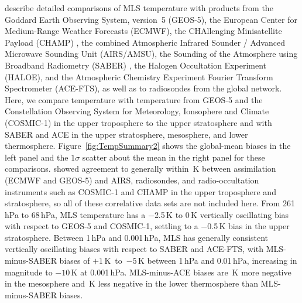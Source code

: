 \sloppypar\citet{SchwartzEtal:2008:Validation} describe detailed comparisons of MLS \vii temperature with products from the Goddard Earth Observing System, version~5 \citep{RieneckerEtal:2007} (\mbox{GEOS-5}), the European Center for Medium-Range Weather Forecasts \citep[e.g.,][]{SimmonsEtal05} (ECMWF), the CHAllenging Minisatellite Payload (CHAMP) \citep{WickertEtal01}, the combined Atmospheric Infrared Sounder / Advanced Microwave Sounding Unit (AIRS/AMSU), the Sounding of the Atmosphere using Broadband Radiometry (SABER) \citep{MlynczakAndRussell:1995}, the Halogen Occultation Experiment \citep{HervigEtal:1996} (HALOE), and the Atmospheric Chemistry Experiment Fourier Transform Spectrometer \citep{BernathEtal:2005} (ACE-FTS), as well as to radiosondes from the global network. Here, we compare \thisv temperature with temperature from \mbox{GEOS-5} and the Constellation Observing System for Meteorology, Ionsophere and Climate (\mbox{COSMIC-1}) \citep{AnthesEtal:2008} in the upper troposphere to the upper stratosphere and with SABER and ACE in the upper stratosphere, mesosphere, and  lower thermosphere. Figure~\ref{fig:TempSummary2} shows the global-mean biases in the left panel and the $1\sigma$ scatter about the mean in the right panel for these comparisons.  \citet{SchwartzEtal:2008:Validation} showed agreement to generally within \,K between assimilation (ECMWF and \mbox{GEOS-5}) and AIRS, radiosondes, and radio-occultation instruments such as \mbox{COSMIC-1} and CHAMP in the upper troposphere and stratosphere, so all of these correlative data sets are not included here.   From 261\,hPa to 68\,hPa, MLS \thisv temperature has a $-$2.5\,K to 0\,K vertically oscillating bias with respect to \mbox{GEOS-5} and \mbox{COSMIC-1}, settling to a $-$0.5\,K bias in the upper stratosphere. Between 1\,hPa and 0.001\,hPa, MLS has generally consistent vertically oscillating biases with respect to SABER and ACE-FTS, with MLS-minus-SABER biases of $+1$\,K~to~$-5$\,K between 1\,hPa and 0.01\,hPa, increasing in magnitude to $-10$\,K at 0.001\,hPa. MLS-minus-ACE biases are \,K more negative in the mesosphere and \,K less negative in the lower thermosphere than MLS-minus-SABER biases. 

